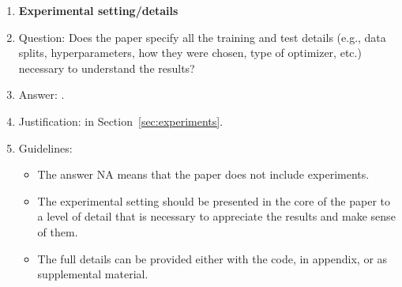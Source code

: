 \documentclass{article}
\begin{document}
{\begin{enumerate}
\item {\bf Experimental setting/details}
    \item[] Question: Does the paper specify all the training and test details (e.g., data splits, hyperparameters, how they were chosen, type of optimizer, etc.) necessary to understand the results?
    \item[] Answer: \answerYes{}.
    \item[] Justification: in Section~\ref{sec:experiments}.
    \item[] Guidelines:
    \begin{itemize}
        \item The answer NA means that the paper does not include experiments.
        \item The experimental setting should be presented in the core of the paper to a level of detail that is necessary to appreciate the results and make sense of them.
        \item The full details can be provided either with the code, in appendix, or as supplemental material.
    \end{itemize}


\end{enumerate}}
\end{document}
